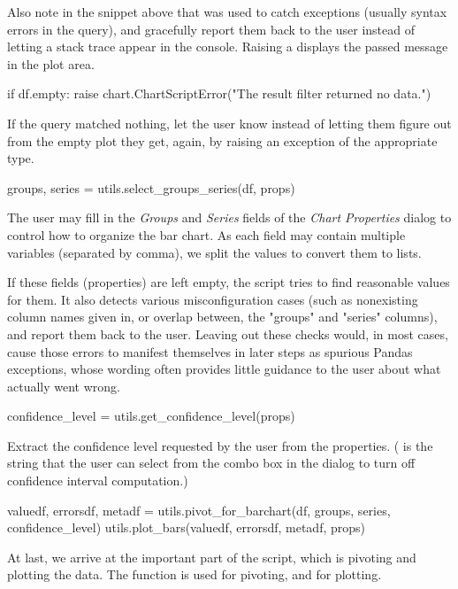 Also note in the snippet above that  was used to catch
exceptions (usually syntax errors in the query), and gracefully report them back
to the user instead of letting a stack trace appear in the console.
Raising a  displays the passed message in the plot area.

\begin{python}
if df.empty:
    raise chart.ChartScriptError("The result filter returned no data.")
\end{python}

If the query matched nothing, let the user know instead of letting them figure out
from the empty plot they get, again, by raising an exception of the appropriate type.

\begin{python}
groups, series = utils.select_groups_series(df, props)
\end{python}


The user may fill in the \textit{Groups} and \textit{Series} fields of the
\textit{Chart Properties} dialog to control how to organize the bar chart.
As each field may contain multiple variables (separated by comma), we split
the values to convert them to lists.

If these fields (properties) are left empty, the script tries to find
reasonable values for them. It also detects various misconfiguration cases
(such as nonexisting column names given in, or overlap between, the "groups"
and "series" columns), and report them back to the user. Leaving out these
checks would, in most cases, cause those errors to manifest themselves in
later steps as spurious Pandas exceptions, whose wording often provides
little guidance to the user about what actually went wrong.

\begin{python}
confidence_level = utils.get_confidence_level(props)
\end{python}

Extract the confidence level requested by the user from the properties.
( is the string that the user can select from the combo box in the
dialog to turn off confidence interval computation.)

\begin{python}
valuedf, errorsdf, metadf =
    utils.pivot_for_barchart(df, groups, series, confidence_level)
utils.plot_bars(valuedf, errorsdf, metadf, props)
\end{python}

At last, we arrive at the important part of the script, which is pivoting and
plotting the data. The  function is used for
pivoting, and  for plotting.

